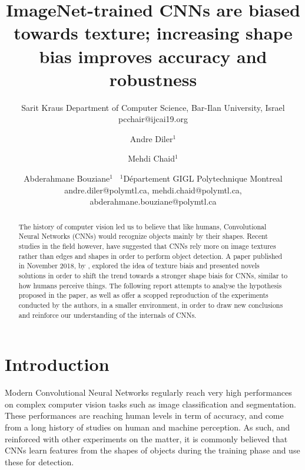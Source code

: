 \documentclass{article}
\title{ImageNet-trained CNNs are biased towards texture; increasing shape bias improves accuracy and robustness}
\author{
    Sarit Kraus
    \affiliations
    Department of Computer Science, Bar-Ilan University, Israel \emails
    pcchair@ijcai19.org
}
\author{
Andre Diler$^1$
\and
Mehdi Chaid$^1$\and
Abderahmane Bouziane$^1$\
\affiliations
$^1$Département GIGL Polytechnique Montreal\\
\emails
andre.diler@polymtl.ca,
mehdi.chaid@polymtl.ca,
abderahmane.bouziane@polymtl.ca
}
\begin{document}
\maketitle

\begin{abstract}

The history of computer vision led us to believe that like humans, 
Convolutional Neural Networks (CNNs) would recognize objects mainly by their shapes.
Recent studies in the field however, have  suggested that CNNs rely more on image textures 
rather than edges and shapes in order to perform object detection. 
A paper published in November 2018, by \cite{geirhos2018imagenettrained}, explored the idea of texture biais
and presented novels solutions in order to shift the trend towards a stronger shape biais for CNNs, similar to 
how humans perceive things.
The following report attempts to analyse the hypothesis proposed in the paper, 
as well as offer a scopped reproduction of the experiments conducted by the authors, in a smaller environment, 
in order to draw new conclusions and reinforce our understanding of the internals of CNNs.
\end{abstract}

\section{Introduction}


Modern Convolutional Neural Networks regularly reach very high performances on complex computer vision tasks 
such as image classification and segmentation.
These performances are reaching human levels in term of accuracy, and come from a long history of studies 
on human and machine perception. As such, and reinforced with other experiments on the matter, 
it is commonly believed that CNNs learn features from the shapes of objects during the training phase
and use these for detection. \smallskip
\end{document}
